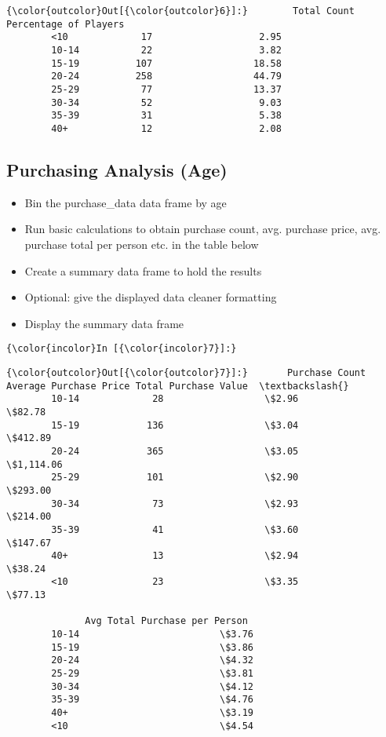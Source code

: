 \documentclass[11pt]{article}
\begin{document}
\begin{Verbatim}[commandchars=\\\{\}]
{\color{outcolor}Out[{\color{outcolor}6}]:}        Total Count  Percentage of Players
        <10             17                   2.95
        10-14           22                   3.82
        15-19          107                  18.58
        20-24          258                  44.79
        25-29           77                  13.37
        30-34           52                   9.03
        35-39           31                   5.38
        40+             12                   2.08
\end{Verbatim}
            
    \subsection{Purchasing Analysis (Age)}\label{purchasing-analysis-age}

    \begin{itemize}
\item
  Bin the purchase\_data data frame by age
\item
  Run basic calculations to obtain purchase count, avg. purchase price,
  avg. purchase total per person etc. in the table below
\item
  Create a summary data frame to hold the results
\item
  Optional: give the displayed data cleaner formatting
\item
  Display the summary data frame
\end{itemize}

    \begin{Verbatim}[commandchars=\\\{\}]
{\color{incolor}In [{\color{incolor}7}]:} 
\end{Verbatim}


\begin{Verbatim}[commandchars=\\\{\}]
{\color{outcolor}Out[{\color{outcolor}7}]:}       Purchase Count Average Purchase Price Total Purchase Value  \textbackslash{}
        10-14             28                  \$2.96               \$82.78   
        15-19            136                  \$3.04              \$412.89   
        20-24            365                  \$3.05            \$1,114.06   
        25-29            101                  \$2.90              \$293.00   
        30-34             73                  \$2.93              \$214.00   
        35-39             41                  \$3.60              \$147.67   
        40+               13                  \$2.94               \$38.24   
        <10               23                  \$3.35               \$77.13   
        
              Avg Total Purchase per Person  
        10-14                         \$3.76  
        15-19                         \$3.86  
        20-24                         \$4.32  
        25-29                         \$3.81  
        30-34                         \$4.12  
        35-39                         \$4.76  
        40+                           \$3.19  
        <10                           \$4.54  
\end{Verbatim}
            
\end{document}
